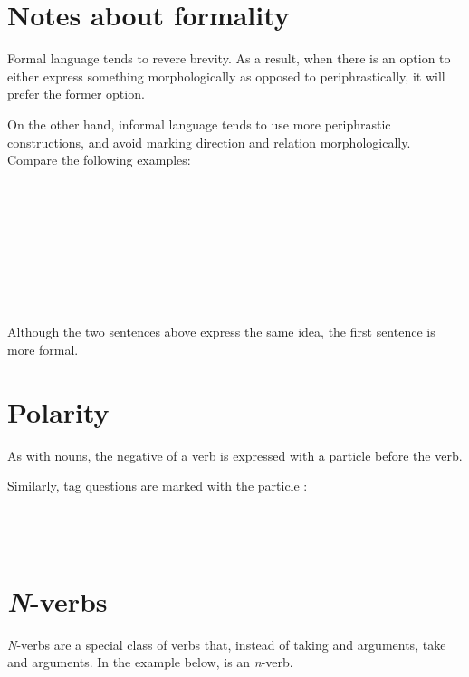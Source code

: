\documentclass{book}
\begin{document}
\section{Notes about formality}

Formal language tends to revere brevity. As a result, when there is an option to either express something morphologically as opposed to periphrastically, it will prefer the former option.

On the other hand, informal language tends to use more periphrastic constructions, and avoid marking direction and relation morphologically. Compare the following examples: \\
~\\
 \\
 \\
~\\
   \\
   \\
\emph{   } \\
~

Although the two sentences above express the same idea, the first sentence is more formal.

\section{Polarity}

As with nouns, the negative of a verb is expressed with a particle  before the verb.

Similarly, tag questions are marked with the particle : \\
~\\
   \\
   \\
  

\section{\emph{N}-verbs}

\emph{N}-verbs are a special class of verbs that, instead of taking  and  arguments, take  and  arguments. In the example below,  is an \emph{n}-verb. \\
~\\
    \\
    \\
\emph{   } \\
\end{document}
